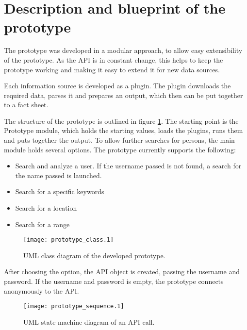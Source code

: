 \section{Description and blueprint of the prototype}

The prototype was developed in a modular approach, to allow easy extensibility
of the prototype. As the \Twitter{} API is in constant change, this helps to
keep the prototype working and making it easy to extend it for new data
sources.

Each information source is developed as a plugin. The plugin downloads the
required data, parses it and prepares an output, which then can be put together
to a fact sheet.

The structure of the prototype is outlined in figure \ref{fig:prototype_class}.
The starting point is the Prototype module, which holds the starting values,
loads the plugins, runs them and puts together the output. To allow further
searches for persons, the main module holds several options. The prototype
currently supports the following:

\begin{itemize}
  \item Search and analyze a user. If the username passed is not found, a
  search for the name passed is launched.
  \item Search for a specific keywords
  \item Search for a location
  \item Search for a range
\end{itemize}

\begin{figure}[ht]
  \begin{center}
    \texttt{[image: prototype\_class.1]}
    \label{fig:prototype_class}
    \caption{UML class diagram of the developed prototype.}
  \end{center}
\end{figure}

After choosing the option, the API object is created, passing the username and
password. If the username and password is empty, the prototype connects
anonymously to the \Twitter{} API.

\begin{figure}[ht]
  \begin{center}
    \texttt{[image: prototype\_sequence.1]}
    \label{fig:prototype_sequence}
    \caption{UML state machine diagram of an \Twitter{} API call.}
  \end{center}
\end{figure}

